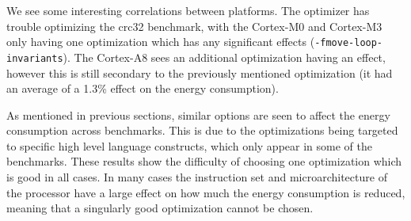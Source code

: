 \documentclass[twocolumn]{article}
\begin{document}
We see some interesting correlations between platforms. The optimizer has trouble optimizing the crc32 benchmark, with the Cortex-M0 and Cortex-M3 only having one optimization which has any significant effects (\texttt{-fmove-loop-invariants}). The Cortex-A8 sees an additional optimization having an effect, however this is still secondary to the previously mentioned optimization (it had an average of a 1.3\% effect on the energy consumption).

As mentioned in previous sections, similar options are seen to affect the energy consumption across benchmarks. This is due to the optimizations being targeted to specific high level language constructs, which only appear in some of the benchmarks. These results show the difficulty of choosing one optimization which is good in all cases. In many cases the instruction set and microarchitecture of the processor have a large effect on how much the energy consumption is reduced, meaning that a singularly good optimization cannot be chosen.
\end{document}
